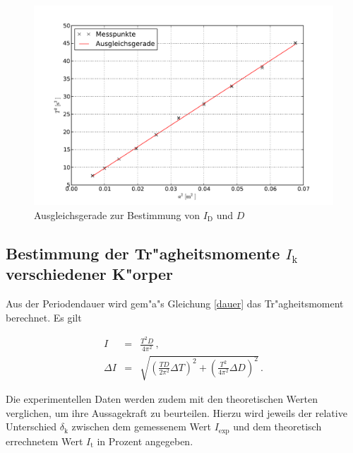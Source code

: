 		\clearpage

		\begin{figure}[h!]
			\centering
			\includegraphics[width = 15cm]{img/graph2_T.pdf}
			\caption{Ausgleichsgerade zur Bestimmung von $I_\mathrm{D}$ und $D$}
			\label{fig:graph2}
		\end{figure}

		\subsection{Bestimmung der Tr"agheitsmomente $I_\mathrm{k}$ verschiedener K"orper}
		\label{subsec:versch_momente}

			Aus der Periodendauer wird gem"a"s Gleichung \eqref{dauer} das Tr"agheitsmoment berechnet.
			Es gilt

			\begin{eqnarray*}
				I & = & \frac{T^2 D}{4 \pi^2} \,, \\
				\Delta I & = & \sqrt{\left(\frac{TD}{2 \pi^2} \Delta T\right)^2 + \left(\frac{T^2}{4 \pi^2} \Delta D\right)^2} \,.
			\end{eqnarray*}

			Die experimentellen Daten werden zudem mit den theoretischen Werten verglichen, um ihre Aussagekraft zu beurteilen.
			Hierzu wird jeweils der relative Unterschied $\delta_\mathrm{k}$ zwischen dem gemessenem Wert $I_\mathrm{exp}$ und dem theoretisch errechnetem Wert $I_\mathrm{t}$ in Prozent angegeben.


